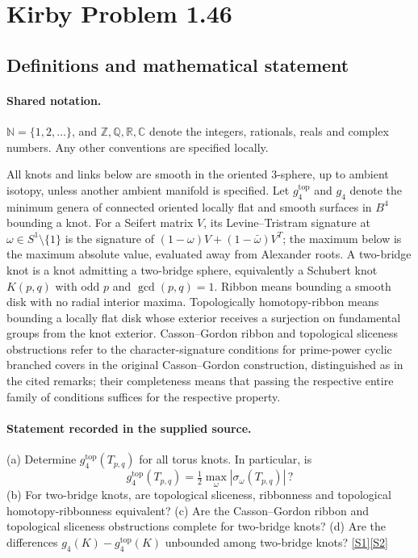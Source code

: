 \documentclass[11pt]{article}
\newcommand{\sref}[2]{\hyperlink{source:#1:#2}{[S#2]}}
\begin{document}
\section{Kirby Problem 1.46}\label{statement}

\subsection{Definitions and mathematical statement}

\paragraph{Shared notation.}$\mathbb N=\{1,2,\ldots\}$, and $\mathbb Z,\mathbb Q,\mathbb R,\mathbb C$ denote the integers, rationals, reals and complex numbers. Any other conventions are specified locally.


All knots and links below are smooth in the oriented $3$-sphere, up to ambient isotopy, unless another ambient manifold is specified. Let $g_4^{\mathrm{top}}$ and $g_4$ denote the minimum genera of connected oriented locally flat and smooth surfaces in $B^4$ bounding a knot. For a Seifert matrix $V$, its Levine--Tristram signature at $\omega\in S^1\setminus\{1\}$ is the signature of $(1-\omega)V+(1-\bar\omega)V^T$; the maximum below is the maximum absolute value, evaluated away from Alexander roots. A two-bridge knot is a knot admitting a two-bridge sphere, equivalently a Schubert knot $K(p,q)$ with odd $p$ and $\gcd(p,q)=1$. Ribbon means bounding a smooth disk with no radial interior maxima. Topologically homotopy-ribbon means bounding a locally flat disk whose exterior receives a surjection on fundamental groups from the knot exterior. Casson--Gordon ribbon and topological sliceness obstructions refer to the character-signature conditions for prime-power cyclic branched covers in the original Casson--Gordon construction, distinguished as in the cited remarks; their completeness means that passing the respective entire family of conditions suffices for the respective property.
\paragraph{Statement recorded in the supplied source.}
(a) Determine $g_4^{\mathrm{top}}(T_{p,q})$ for all torus knots. In particular, is\[g_4^{\mathrm{top}}(T_{p,q})=\tfrac12\max_\omega|\sigma_\omega(T_{p,q})|\,?\] (b) For two-bridge knots, are topological sliceness, ribbonness and topological homotopy-ribbonness equivalent? (c) Are the Casson--Gordon ribbon and topological sliceness obstructions complete for two-bridge knots? (d) Are the differences $g_4(K)-g_4^{\mathrm{top}}(K)$ unbounded among two-bridge knots? \sref{statement}{1}\sref{statement}{2}
\end{document}
